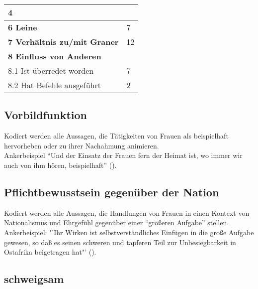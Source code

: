\documentclass[12pt, titlepage=true, toc=bib]{scrartcl}
\begin{document}
{\begin{tabular}{p{145pt}p{10pt}}
{{\small 4}
} \\
\hline
\parbox{145pt}{\raggedright 
{\small \textbf{6 Leine}}
} & \parbox{10pt}{\raggedright 
{\small 7}
} \\
\hline
\parbox{145pt}{\raggedright 
{\small \textbf{7 Verhältnis zu/mit Graner}}
} & \parbox{10pt}{\raggedright 
{\small 12}
} \\
\hline
\parbox{145pt}{\raggedright 
{\small \textbf{8 Einfluss von Anderen}}
} \\
\hline
\parbox{145pt}{\raggedright 
{\small      8.1 Ist überredet worden}
} & \parbox{10pt}{\raggedright 
{\small 7}
} \\
\hline
\parbox{145pt}{\raggedright 
{\small      8.2 Hat Befehle ausgeführt}
} & \parbox{10pt}{\raggedright 
{\small 2}
} \\
\hline
\end{tabular}
\vspace{2pt}

}

\newpage

\subsection*{Vorbildfunktion}

Kodiert werden alle Aussagen, die Tätigkeiten von Frauen als beispielhaft hervorheben oder zu ihrer Nachahmung animieren.\\
Ankerbeispiel "`Und der Einsatz der Frauen fern der Heimat ist, wo immer wir auch von ihm hören, beispielhaft"' (\cite[669]{maltzahn_deutsche_1936}).

\subsection*{Pflichtbewusstsein gegenüber der Nation}

Kodiert werden alle Aussagen, die Handlungen von Frauen in einen Kontext von Nationalismus und Ehrgefühl gegenüber einer "`größeren Aufgabe"' stellen.\\
Ankerbeispiel: "'Ihr Wirken ist selbstverständliches Einfügen in die große Aufgabe gewesen, so daß es seinen schweren und tapferen Teil zur Unbesiegbarkeit in Ostafrika beigetragen hat"' (\cite[669]{maltzahn_deutsche_1936}).

\subsection*{schweigsam}
\end{document}
